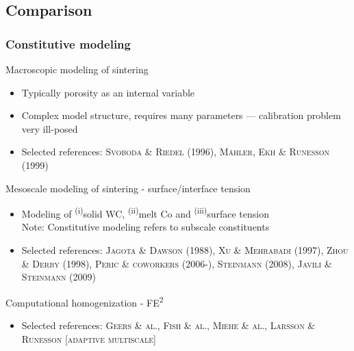 \documentclass[11pt]{beamer} %
\newcommand{\roughcite}[1]{\textsc{#1}}
\begin{document}
\subsection{Comparison}
\begin{frame}
 \frametitle{Constitutive modeling}
 Macroscopic modeling of sintering
 \begin{itemize}
  \item Typically porosity as an internal variable
  \item Complex model structure, requires many parameters --- calibration problem very ill-posed
  \item Selected references: \roughcite{Svoboda \& Riedel (1996)}, \roughcite{Mähler, Ekh \& Runesson (1999)}
 \end{itemize}

Mesoscale modeling of sintering - surface/interface tension
 \begin{itemize}
 \item Modeling of \textsuperscript{(i)}solid WC, \textsuperscript{(ii)}melt Co and \textsuperscript{(iii)}surface tension\\
  Note: Constitutive modeling refers to subscale constituents
  \item Selected references: \roughcite{Jagota \& Dawson (1988)}, \roughcite{Xu \& Mehrabadi (1997)}, \roughcite{Zhou \& Derby (1998)}, \roughcite{Peric \& coworkers (2006-)}, \roughcite{Steinmann (2008)}, \roughcite{Javili \& Steinmann (2009)}
 \end{itemize}

Computational homogenization - FE\textsuperscript{2}
\begin{itemize}
  \item Selected references:  \roughcite{Geers \& al.},  \roughcite{Fish \& al.},
 \roughcite{Miehe \& al.}, \roughcite{Larsson \& Runesson [adaptive multiscale]}
\end{itemize}
\end{frame}

\end{document}
